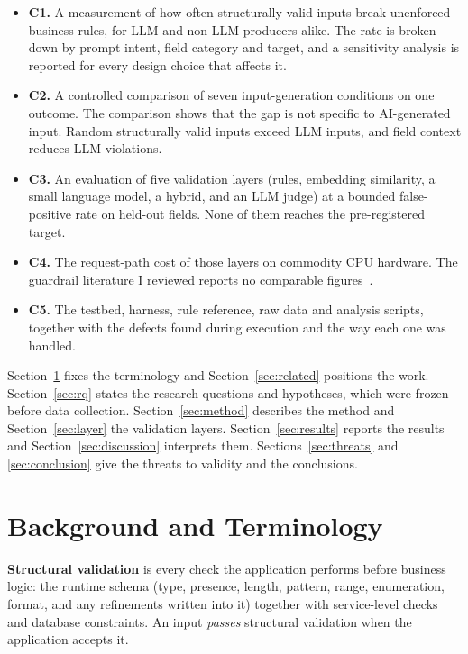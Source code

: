 \documentclass[conference]{IEEEtran}
\begin{document}
\begin{itemize}
  \item \textbf{C1.} A measurement of how often structurally valid inputs break unenforced business
  rules, for LLM and non-LLM producers alike. The rate is broken down by prompt intent, field category
  and target, and a sensitivity analysis is reported for every design choice that affects it.
  \item \textbf{C2.} A controlled comparison of seven input-generation conditions on one outcome. The
  comparison shows that the gap is not specific to AI-generated input. Random structurally valid inputs
  exceed LLM inputs, and field context reduces LLM violations.
  \item \textbf{C3.} An evaluation of five validation layers (rules, embedding similarity, a small
  language model, a hybrid, and an LLM judge) at a bounded false-positive rate on held-out fields. None
  of them reaches the pre-registered target.
  \item \textbf{C4.} The request-path cost of those layers on commodity CPU hardware. The guardrail
  literature I reviewed reports no comparable
  figures~\cite{jacob2025promptshield,ahmed2026reflexguard,saleem2026layered,wang2026sokguardrails}.
  \item \textbf{C5.} The testbed, harness, rule reference, raw data and analysis scripts, together with
  the defects found during execution and the way each one was handled.
\end{itemize}

Section~\ref{sec:background} fixes the terminology and Section~\ref{sec:related} positions the work.
Section~\ref{sec:rq} states the research questions and hypotheses, which were frozen before data
collection. Section~\ref{sec:method} describes the method and Section~\ref{sec:layer} the validation
layers. Section~\ref{sec:results} reports the results and Section~\ref{sec:discussion} interprets them.
Sections~\ref{sec:threats} and \ref{sec:conclusion} give the threats to validity and the conclusions.

\section{Background and Terminology}
\label{sec:background}

\textbf{Structural validation} is every check the application performs before business logic: the
runtime schema (type, presence, length, pattern, range, enumeration, format, and any refinements
written into it) together with service-level checks and database constraints. An input
\emph{passes} structural validation when the application accepts it.
\end{document}
